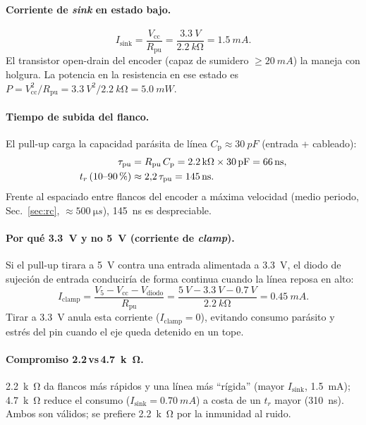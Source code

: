 \documentclass[11pt,letterpaper]{article}
\begin{document}
\paragraph{Corriente de \emph{sink} en estado bajo.}
\begin{equation}
  I_\text{sink} = \frac{V_\text{cc}}{R_\text{pu}}
  = \frac{\SI{3.3}{V}}{\SI{2.2}{k\ohm}} = \SI{1.5}{mA}.
\end{equation}
El transistor open-drain del encoder (capaz de sumidero $\ge\SI{20}{mA}$) la maneja
con holgura. La potencia en la resistencia en ese estado es
$P=V_\text{cc}^2/R_\text{pu}=\SI{3.3}{V}^2/\SI{2.2}{k\ohm}=\SI{5.0}{mW}$.

\paragraph{Tiempo de subida del flanco.} El pull-up carga la capacidad parásita de
línea $C_\text{p}\approx\SI{30}{pF}$ (entrada + cableado):
\begin{align}
  \tau_\text{pu} &= R_\text{pu}\,C_\text{p}
     = \SI{2.2}{k\ohm}\times\SI{30}{pF} = \SI{66}{ns}, \\
  t_r\,\text{(10--90\,\%)} &\approx 2{,}2\,\tau_\text{pu} = \SI{145}{ns}.
\end{align}
Frente al espaciado entre flancos del encoder a máxima velocidad (medio periodo,
Sec.~\ref{sec:rc}, $\approx\SI{500}{\micro s}$), \SI{145}{ns} es despreciable.

\paragraph{Por qué \SI{3.3}{V} y no \SI{5}{V} (corriente de \emph{clamp}).}
Si el pull-up tirara a \SI{5}{V} contra una entrada alimentada a \SI{3.3}{V}, el
diodo de sujeción de entrada conduciría de forma continua cuando la línea reposa en
alto:
\begin{equation}
  I_\text{clamp} = \frac{V_5 - V_\text{cc} - V_\text{diodo}}{R_\text{pu}}
  = \frac{\SI{5}{V}-\SI{3.3}{V}-\SI{0.7}{V}}{\SI{2.2}{k\ohm}}
  = \SI{0.45}{mA}.
\end{equation}
Tirar a \SI{3.3}{V} anula esta corriente ($I_\text{clamp}=0$), evitando consumo
parásito y estrés del pin cuando el eje queda detenido en un tope.

\paragraph{Compromiso \SI{2.2}{}\,vs\,\SI{4.7}{k\ohm}.} \SI{2.2}{k\ohm} da flancos
más rápidos y una línea más ``rígida'' (mayor $I_\text{sink}$, \SI{1.5}{mA});
\SI{4.7}{k\ohm} reduce el consumo ($I_\text{sink}=\SI{0.70}{mA}$) a costa de un
$t_r$ mayor (\SI{310}{ns}). Ambos son válidos; se prefiere \SI{2.2}{k\ohm} por la
inmunidad al ruido.
\end{document}
